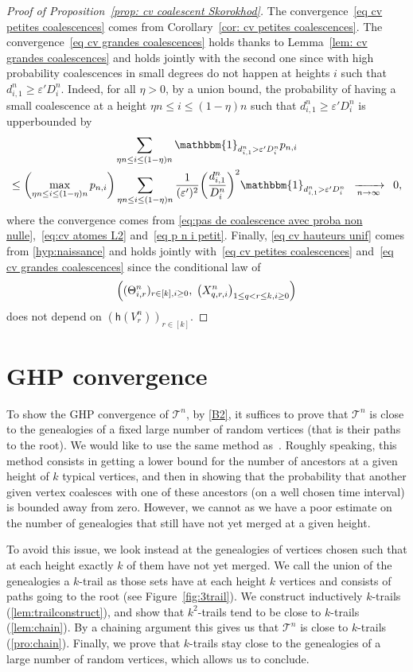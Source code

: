 \documentclass[AHL,Unicode,published]{cedram}
\newcommand{\e}{\varepsilon}
\newcommand{\cv}[1][n]{\enskip\xrightarrow[#1 \to \infty]{}\enskip}
\newcommand{\1}{\mathbbm{1}}
\newcommand{\T}{\mathcal{T}}
\newcommand{\h}{\mathsf{h}}
\let\originalleft\left
\let\originalright\right
\renewcommand{\left}{\mathopen{}\mathclose\bgroup\originalleft}
\renewcommand{\right}{\aftergroup\egroup\originalright}
\renewcommand*{\to}{\mathchoice{\longrightarrow}{\rightarrow}{\rightarrow}{\rightarrow}}
\begin{document}
\begin{proof}[Proof of Proposition~\ref{prop: cv coalescent Skorokhod}]
The convergence~\eqref{eq cv petites coalescences} comes from Corollary~\ref{cor: cv petites coalescences}. The convergence~\eqref{eq cv grandes coalescences} holds thanks to Lemma~\ref{lem: cv grandes coalescences} and holds jointly with the second one since with high probability coalescences in small degrees do not happen at heights $i$ such that $d^n_{i,1} \ge \e' D^n_i$. Indeed, for all $\eta>0$, by a union bound, the probability of having a small coalescence at a height $\eta n \le i \le (1-\eta) n$ such that $d^n_{i,1} \ge \e' D^n_i$ is upperbounded by
\begin{multline*}
\sum_{\eta n \le i\le (1-\eta) n} \1_{d^n_{i,1} > \e' D^n_i} p_{n,i}\\
\le
\left(\max_{\eta n \le i \le (1-\eta)n} p_{n,i}\right)
\sum_{\eta n \le i\le (1-\eta) n} \frac{1}{(\e')^2} {\left(\frac{d^n_{i,1}}{{D^n_i}}\right)^2} \1_{d^n_{i,1} > \e' D^n_i}
\cv[n] 0,
\end{multline*}
where the convergence comes from \eqref{eq:pas de coalescence avec proba non nulle},~\eqref{eq:cv atomes L2} and~\eqref{eq p n i petit}. Finally, \eqref{eq cv hauteurs unif} comes from \ref{hyp:naissance} and holds jointly with~\eqref{eq cv petites coalescences} and~\eqref{eq cv grandes coalescences} since the conditional law of
\[
\left((\Theta^n_{i,r})_{r \in [k], i\ge 0},\;\bigl(X^n_{q,r,i}\bigr)_{1 \le q<r \le k, i\ge 0}\right)
\]
does not depend on $(\h(V^n_r))_{r \in [k]}$.
\end{proof}


\section{GHP convergence}\label{sec:proofGHP}
To show the GHP convergence of $\T^n$, by \cref{B2}, it suffices to prove that $\T^n$ is close to the genealogies of a fixed large number of random vertices (that is their paths to the root). We would like to use the same method as~\cite{BBKKbis23+}. {Roughly speaking, this method consists in getting a lower bound for the number of ancestors at a given height of $k$ typical vertices, and then in showing that the probability that another given vertex coalesces with one of these ancestors (on a well chosen time interval) is bounded away from zero.} However, we cannot as we have {a} poor estimate on the number of genealogies that still have not yet merged at {a} given height.

To avoid this issue, we look instead at the genealogies of vertices chosen such that at each height exactly $k$ of them have not yet merged. We call the union of the genealogies a $k$-trail as those sets have at each height $k$ vertices and consists of paths going to the root (see Figure~\ref{fig:3trail}). We construct inductively $k$-trails (\cref{lem:trailconstruct}), and show that $k^2$-trails tend to be close to $k$-trails (\cref{lem:chain}). By a chaining argument this gives us that $\T^n$ is close to $k$-trails (\cref{pro:chain}). Finally, we prove that $k$-trails stay close to the genealogies of a large number of random vertices, which allows us to conclude.
\end{document}
